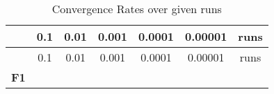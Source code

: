 \documentclass[12pt,a4paper]{article}
\begin{document}
\begin{longtable}[c]{@{}ccccccc@{}}
\caption{Convergence Rates over given runs}\tabularnewline
\toprule
\begin{minipage}[b]{0.11\columnwidth}\centering\strut
~
\strut\end{minipage} &
\begin{minipage}[b]{0.08\columnwidth}\centering\strut
0.1
\strut\end{minipage} &
\begin{minipage}[b]{0.08\columnwidth}\centering\strut
0.01
\strut\end{minipage} &
\begin{minipage}[b]{0.09\columnwidth}\centering\strut
0.001
\strut\end{minipage} &
\begin{minipage}[b]{0.10\columnwidth}\centering\strut
0.0001
\strut\end{minipage} &
\begin{minipage}[b]{0.11\columnwidth}\centering\strut
0.00001
\strut\end{minipage} &
\begin{minipage}[b]{0.07\columnwidth}\centering\strut
runs
\strut\end{minipage}\tabularnewline
\midrule
\endfirsthead
\toprule
\begin{minipage}[b]{0.11\columnwidth}\centering\strut
~
\strut\end{minipage} &
\begin{minipage}[b]{0.08\columnwidth}\centering\strut
0.1
\strut\end{minipage} &
\begin{minipage}[b]{0.08\columnwidth}\centering\strut
0.01
\strut\end{minipage} &
\begin{minipage}[b]{0.09\columnwidth}\centering\strut
0.001
\strut\end{minipage} &
\begin{minipage}[b]{0.10\columnwidth}\centering\strut
0.0001
\strut\end{minipage} &
\begin{minipage}[b]{0.11\columnwidth}\centering\strut
0.00001
\strut\end{minipage} &
\begin{minipage}[b]{0.07\columnwidth}\centering\strut
runs
\strut\end{minipage}\tabularnewline
\midrule
\endhead
\begin{minipage}[t]{0.11\columnwidth}\centering\strut
\textbf{F1}
\strut\end{minipage} &

\end{longtable}
\end{document}
